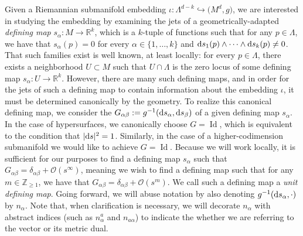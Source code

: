 \documentclass[pdftex]{sigma}
\numberwithin{equation}{section}
\renewcommand{\=}{\stackrel \Lambda =}
\DeclareMathOperator{\Id}{Id}
\begin{document}
Given a Riemannian submanifold embedding $\iota \colon \Lambda^{d-k} \hookrightarrow \bigl(M^d,g\bigr)$, we are interested in studying the embedding by examining the jets of a geometrically-adapted \textit{defining map} $s_{\alpha} \colon M \rightarrow \mathbb{R}^k$, which is a $k$-tuple of functions such that for any $p \in \Lambda$, we have that $s_{\alpha}(p) = 0$ for every $\alpha \in \{1, \ldots, k\}$ and ${\rm d}s_{1}(p) \wedge \cdots \wedge {\rm d}s_{k}(p) \neq 0$. That such families exist is well known, at least locally: for every $p \in \Lambda$, there exists a neighborhood $U \subset M$ such that $U \cap \Lambda$ is the zero locus of some defining map $s_{\alpha} \colon U \rightarrow \mathbb{R}^k$. However, there are many such defining maps, and in order for the jets of such a defining map to contain information about the embedding $\iota$, it must be determined canonically by the geometry. To realize this canonical defining map, we consider the  $G_{\alpha \beta} := g^{-1}({\rm d}s_{\alpha},{\rm d}s_{\beta})$ of a given defining map $s_{\alpha}$. In the case of hypersurfaces, we canonically choose $G = \Id$, which is equivalent to the condition that $|{\rm d}s|^2 = 1$. Similarly, in the case of a higher-codimension submanifold we would like to achieve $G= \Id$. Because we will work locally, it is sufficient for our purposes to find a defining map $s_{\alpha}$ such that $G_{\alpha \beta} = \delta_{\alpha \beta} + \mathcal{O}(s^\infty)$, meaning we wish to find a defining map such that for any $m \in \mathbb{Z}_{\geq 1}$, we have that $G_{\alpha \beta} = \delta_{\alpha \beta} + \mathcal{O}(s^m)$. We call such a defining map a \textit{unit defining map}. Going forward, we will abuse notation by also denoting $g^{-1}({\rm d}s_{\alpha},\cdot)$ by $n_{\alpha}$. Note that, when clarification is necessary, we will decorate $n_{\alpha}$ with abstract indices (such as $n^a_{\alpha}$ and $n_{a \alpha}$) to indicate the whether we are referring to the vector or its metric dual.
\end{document}
